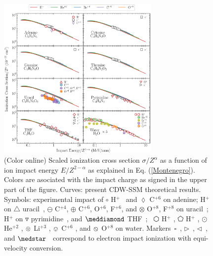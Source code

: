 \documentclass[10pt,showpacs,showkeys,twocolumn]{revtex4}
\begin{document}
\begin{figure}[!t]%
\centering
\includegraphics[width=0.7\textwidth]{zscale_alpha.eps}
\caption{(Color online) Scaled ionization cross section $\sigma/Z^{\alpha}$ as a function 
of ion impact energy $E/Z^{2-\alpha}$ as explained in Eq. (\ref{Montenegro}). Colors are asociated with the impact charge as signed in the upper part of the figure. Curves: present CDW-SSM theoretical results.
Symbols: experimental impact of 
\mbox{\Large$\circ$} H$^+$~\cite{iriki2011} and 
$\lozenge$ C$^{+6}$ \cite{tribedi2019} on adenine;
H$^+$ on  $\triangle$ uracil~\cite{itoh2013}, 
$\ominus$ C$^{+4}$, 
$\oplus$ C$^{+6}$, O$^{+6}$, F$^{+6}$, and 
$\otimes$ O$^{+8}$, F$^{+8}$ on uracil~\cite{agnihotri2012,agnihotri2013};
H$^+$ on $\triangledown$ pyrimidine~\cite{wolff2014}, and
$\meddiamond$ THF~\cite{wang2016};
\mbox{\fontsize{10}{20} $\varhexagon$} H$^+$ \cite{Luna2007}, 
$\pentagon$ H$^+$ \cite{Rudd86}, 
$\odot$ He$^{+2}$ \cite{Rudd85},  
$\logof$ Li$^{+3}$ \cite{Luna_Li_water},  
$\ovee$ C$^{+6}$ \cite{DalCappello2009}, and 
$\varobslash$ O$^{+8}$ \cite{Tribedi_O_water} on water.
Markers~$\square$~\cite{rahman2016}, 
$\rhd$~\cite{bug2017}, 
$\lhd$~\cite{wolf2019}, and 
$\medstar$~\cite{fuss2009} correspond to electron impact ionization with equi-velocity conversion.}
\label{fig:zreduced}
\end{figure} 

 
\end{document}
